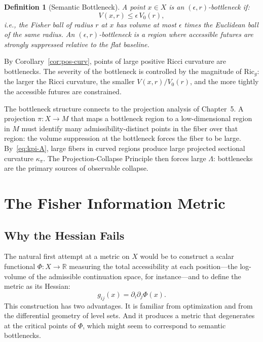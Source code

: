 \documentclass[12pt, oneside]{book}
\theoremstyle{plain-flyxion}
\theoremstyle{definition-flyxion}
\newtheorem{definition}[theorem]{Definition}
\newcommand{\Phifield}{\Phi}
\newcommand{\kpi}{\kappa_{\pi}}
\newcommand{\Lam}{\Lambda}
\begin{document}
\begin{definition}[Semantic Bottleneck]\label{def:bottleneck}
A point $x \in X$ is an \emph{$(\epsilon, r)$-bottleneck} if:
\begin{equation}\label{eq:bottleneck}
V(x, r) \leq \epsilon\, V_0(r),
\end{equation}
i.e., the Fisher ball of radius $r$ at $x$ has volume at most $\epsilon$ times the
Euclidean ball of the same radius. An $(\epsilon, r)$-bottleneck is a region where
accessible futures are strongly suppressed relative to the flat baseline.
\end{definition}

By Corollary~\ref{cor:pos-curv}, points of large positive Ricci curvature are bottlenecks.
The severity of the bottleneck is controlled by the magnitude of $\mathrm{Ric}_g$: the
larger the Ricci curvature, the smaller $V(x,r)/V_0(r)$, and the more tightly the
accessible futures are constrained.

The bottleneck structure connects to the projection analysis of Chapter~5. A projection
$\pi: X \to M$ that maps a bottleneck region to a low-dimensional region in $M$ must
identify many admissibility-distinct points in the fiber over that region: the volume
suppression at the bottleneck forces the fiber to be large. By~\eqref{eq:kpi-A}, large
fibers in curved regions produce large projected sectional curvature $\kpi$. The
Projection-Collapse Principle then forces large $\Lam$: bottlenecks are the primary
sources of observable collapse.

\chapter{The Fisher Information Metric}

\section{Why the Hessian Fails}

The natural first attempt at a metric on $X$ would be to construct a scalar functional
$\Phifield: X \to \mathbb{R}$ measuring the total accessibility at each position---the
log-volume of the admissible continuation space, for instance---and to define the metric
as its Hessian:
\[
g_{ij}(x) = \partial_i \partial_j \Phifield(x).
\]
This construction has two advantages. It is familiar from optimization and from the
differential geometry of level sets. And it produces a metric that degenerates at the
critical points of $\Phifield$, which might seem to correspond to semantic bottlenecks.
\end{document}
